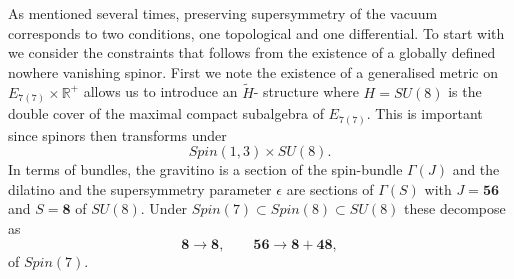 As mentioned several times, preserving supersymmetry of the vacuum corresponds to two conditions, one topological and one differential. To start with we consider the constraints that follows from the existence of a globally defined nowhere vanishing spinor. First we note the existence of a generalised metric on $E_{7(7)}\times\mathbb{R}^+$ allows us to introduce an $\tilde{H}$- structure where $H=SU(8)$ is the double cover of the maximal compact subalgebra of $E_{7(7)}$. This is important since spinors then transforms under  
\begin{equation}
    Spin(1,3)\times SU(8).
\end{equation}
In terms of bundles, the gravitino is a section of the spin-bundle $\Gamma(J)$ and the dilatino and the supersymmetry parameter $\epsilon$ are sections of $\Gamma(S)$ with 
$J=\mathbf{56}$ and $S=\mathbf{8}$ of $SU(8)$. Under $Spin(7)\subset Spin(8)\subset SU(8)$ these decompose as 
\begin{equation}
    \mathbf{8}\to \mathbf{8}, \qquad  \mathbf{56}\to \mathbf{8}+\mathbf{48},
\end{equation}
of $Spin(7)$. 



